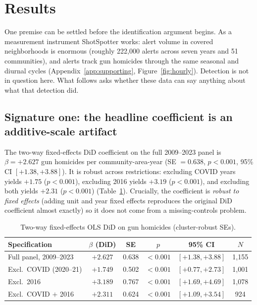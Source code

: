\documentclass[12pt]{article}
\begin{document}
\section{Results}

One premise can be settled before the identification argument begins. As a measurement
instrument ShotSpotter works: alert volume in covered neighborhoods is enormous (roughly
222,000 alerts across seven years and 51 communities), and alerts track gun homicides
through the same seasonal and diurnal cycles (Appendix~\ref{app:supporting},
Figure~\ref{fig:hourly}). Detection is not in question here. What follows asks whether these
data can say anything about what that detection did.

\subsection{Signature one: the headline coefficient is an additive-scale artifact}
\label{sec:count}

The two-way fixed-effects DiD coefficient on the full 2009--2023 panel is
$\beta = +2.627$ gun homicides per community-area-year (SE $= 0.638$, $p < 0.001$, 95\%
CI $[+1.38, +3.88]$). It is robust across restrictions: excluding COVID years yields
$+1.75$ ($p < 0.001$), excluding 2016 yields $+3.19$ ($p < 0.001$), and excluding both
yields $+2.31$ ($p < 0.001$) (Table~\ref{tab:twfe}). Crucially, the coefficient is
\emph{robust to fixed effects} (adding unit and year fixed effects reproduces the
original DiD coefficient almost exactly) so it does not come from a missing-controls
problem.

\begin{table}[H]
\centering
\small
\caption{Two-way fixed-effects OLS DiD on gun homicides (cluster-robust SEs).}
\label{tab:twfe}
\begin{tabular}{lccccc}
\toprule
Specification & $\beta$ (DiD) & SE & $p$ & 95\% CI & $N$ \\
\midrule
Full panel, 2009--2023        & $+2.627$ & 0.638 & $<0.001$ & $[+1.38, +3.88]$ & 1,155 \\
Excl.\ COVID (2020--21)       & $+1.749$ & 0.502 & $<0.001$ & $[+0.77, +2.73]$ & 1,001 \\
Excl.\ 2016                   & $+3.189$ & 0.767 & $<0.001$ & $[+1.69, +4.69]$ & 1,078 \\
Excl.\ COVID $+$ 2016         & $+2.311$ & 0.624 & $<0.001$ & $[+1.09, +3.54]$ & \phantom{0}924 \\
\bottomrule
\end{tabular}
\end{table}
\end{document}

